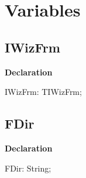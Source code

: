 \documentclass{report}
\newif\ifpdf
\begin{document}
\section{Variables}
\ifpdf
\subsection*{\large{\textbf{IWizFrm}}\normalsize\hspace{1ex}\hrulefill}
\else
\subsection*{IWizFrm}
\fi
\label{mainunit-IWizFrm}
\begin{list}{}{
\setlength{\itemindent}{0cm}
\setlength{\listparindent}{0cm}
\setlength{\leftmargin}{\evensidemargin}
\addtolength{\leftmargin}{\tmplength}
\settowidth{\labelsep}{X}
\addtolength{\leftmargin}{\labelsep}
\setlength{\labelwidth}{\tmplength}
}
\item[\textbf{Declaration}\hfill]
\ifpdf
\begin{flushleft}
\fi
\begin{ttfamily}
IWizFrm: TIWizFrm;\end{ttfamily}

\ifpdf
\end{flushleft}
\fi

\end{list}
\ifpdf
\subsection*{\large{\textbf{FDir}}\normalsize\hspace{1ex}\hrulefill}
\else
\subsection*{FDir}
\fi
\label{mainunit-FDir}
\begin{list}{}{
\setlength{\itemindent}{0cm}
\setlength{\listparindent}{0cm}
\setlength{\leftmargin}{\evensidemargin}
\addtolength{\leftmargin}{\tmplength}
\settowidth{\labelsep}{X}
\addtolength{\leftmargin}{\labelsep}
\setlength{\labelwidth}{\tmplength}
}
\item[\textbf{Declaration}\hfill]
\ifpdf
\begin{flushleft}
\fi
\begin{ttfamily}
FDir:  String;\end{ttfamily}

\ifpdf
\end{flushleft}
\fi

\end{list}
\ifpdf
\end{document}
